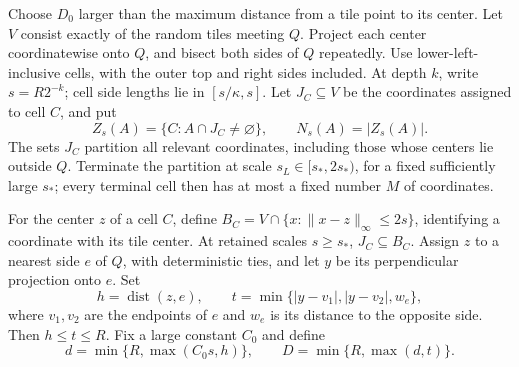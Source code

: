 \documentclass[11pt]{amsart}
\theoremstyle{remark}
\begin{document}
Choose $D_0$ larger than the maximum distance from a tile point to its center. Let $V$ consist exactly of the random tiles meeting $Q$. Project each center coordinatewise onto $Q$, and bisect both sides of $Q$ repeatedly. Use lower-left-inclusive cells, with the outer top and right sides included. At depth $k$, write $s=R2^{-k}$; cell side lengths lie in $[s/\kappa,s]$. Let $J_C\subseteq V$ be the coordinates assigned to cell $C$, and put
\[
 Z_s(A)=\{C:A\cap J_C\ne\varnothing\},\qquad N_s(A)=|Z_s(A)|.
\]
The sets $J_C$ partition all relevant coordinates, including those whose centers lie outside $Q$. Terminate the partition at scale $s_L\in[s_*,2s_*)$, for a fixed sufficiently large $s_*$; every terminal cell then has at most a fixed number $M$ of coordinates.

For the center $z$ of a cell $C$, define $B_C=V\cap\{x:\|x-z\|_\infty\le2s\}$, identifying a coordinate with its tile center. At retained scales $s\ge s_*$, $J_C\subseteq B_C$. Assign $z$ to a nearest side $e$ of $Q$, with deterministic ties, and let $y$ be its perpendicular projection onto $e$. Set
\[
 h=\operatorname{dist}(z,e),\qquad
 t=\min\{|y-v_1|,|y-v_2|,w_e\},
\]
where $v_1,v_2$ are the endpoints of $e$ and $w_e$ is its distance to the opposite side.
Then $h\le t\le R$. Fix a large constant $C_0$ and define
\[
 d=\min\{R,\max(C_0s,h)\},\qquad
 D=\min\{R,\max(d,t)\}.
\]
\end{document}

